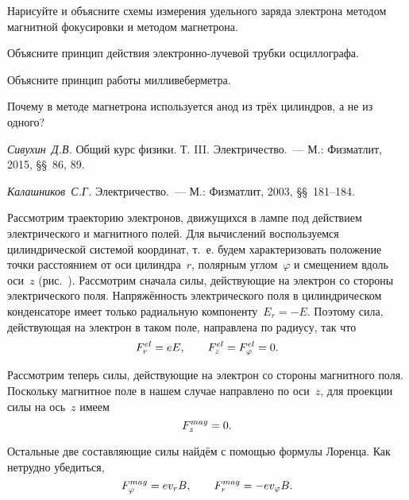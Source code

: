 \begin{lab:questions}
\item{ Нарисуйте и объясните схемы измерения удельного заряда электрона методом
магнитной фокусировки и методом магнетрона.}
\item{Объясните принцип действия электронно-лучевой трубки осциллографа.}
\item{ Объясните принцип работы милливеберметра.}
\item{ Почему в методе магнетрона используется анод из трёх цилиндров, а не из
одного?}
\end{lab:questions}

\begin{lab:literature}
\item{ \emph {Сивухин~Д.В.} Общий курс физики. Т. III. Электричество.~--- М.:
Физматлит, 2015, \S\S~86, 89.}
\item{ \emph {Калашников~С.Г.} Электричество.~--- М.: Физматлит, 2003,
\S\S~181--184.}
\end{lab:literature}





Рассмотрим траекторию электронов, движущихся в лампе под действием
электрического и магнитного полей. Для вычислений воспользуемся цилиндрической
системой координат, т.~е. будем характеризовать положение точки расстоянием от
оси цилиндра~$r$, полярным углом~$\varphi$ и смещением вдоль оси~$z$
(рис.~). Рассмотрим сначала силы, действующие на
электрон со стороны электрического поля. Напряжённость электрического поля в
цилиндрическом конденсаторе имеет только радиальную компоненту~$E_r=-E$. Поэтому
сила, действующая на электрон в таком поле, направлена по радиусу, так что
\begin{equation}
	F_r^{el}=eE,\qquad F_z^{el}=F_{\varphi}^{el}=0.
	\eqmark{3.1.4}
\end{equation}

Рассмотрим теперь силы, действующие на электрон со стороны магнитного поля.
Поскольку магнитное поле в нашем случае
направлено по оси~$z$, для проекции силы на ось~$z$ имеем
\begin{equation}
	F_z^{mag}=0.
	\eqmark{3.1.5}
\end{equation}

Остальные две составляющие силы найдём с помощью формулы Лоренца. Как нетрудно
убедиться,
\begin{equation}
	F_{\varphi}^{mag}=ev_rB,\qquad F_{r}^{mag}=-ev_{\varphi}B.
	\eqmark{3.1.6}
\end{equation}


